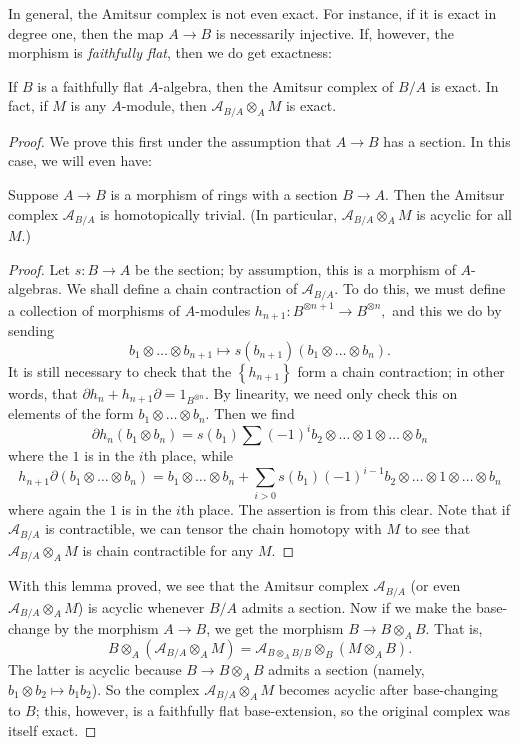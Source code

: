 In general, the Amitsur complex is not even exact. 
For instance, if it is exact in degree one, then the map $A \to B$ is necessarily injective.
If, however, the morphism is \emph{faithfully flat}, then we do get exactness:

\begin{theorem} 
If $B$ is a faithfully flat $A$-algebra, then the Amitsur complex of $B/A$ is
exact.  In fact, if $M$ is any $A$-module, then $\mathcal{A}_{B/A} \otimes_A
M$ is exact.
\end{theorem} 
\begin{proof} 
We prove this first under the assumption that $A \to B$ has a section. 
In this case, we will even have:

\begin{lemma} 
Suppose $A \to B$ is a morphism of rings with a section $B \to A$. Then the
Amitsur complex $\mathcal{A}_{B/A}$ is homotopically trivial. (In particular,
$\mathcal{A}_{B/A} \otimes_A M$ is acyclic for all $M$.)
\end{lemma} 
\begin{proof} 
Let $s: B \to A$ be the section; by assumption, this is a morphism of
$A$-algebras. We shall define a chain contraction of $\mathcal{A}_{B/A}$. 
To do this, we must define a collection of morphisms of $A$-modules
\( h_{n+1} : B^{\otimes n+1} \to B^{\otimes n},  \)
and this we do by sending 
\[ b_1 \otimes \dots \otimes b_{n+1} \mapsto s(b_{n+1}) \left( b_1 \otimes
\dots \otimes b_n \right).  \]
It is still necessary to check that the $\left\{h_{n+1}\right\}$ form a chain
contraction; in other words, that $\partial h_{n} + h_{n+1} \partial =
1_{B^{\otimes n}}$. 
By linearity, we need only check this on elements of the form $b_1 \otimes
\dots \otimes b_n$. Then we find
\[ \partial h_n (b_1 \otimes b_n) = s(b_1) \sum (-1)^i b_2 \otimes \dots \otimes 1
\otimes \dots \otimes b_n  \]
where the $1$ is in the $i$th place,
while
\[ h_{n+1} \partial ( b_1 \otimes \dots \otimes  b_n) = b_1 \otimes \dots \otimes b_n +
\sum_{i>0} s(b_1) (-1)^{i-1}b_2 \otimes \dots \otimes 1 \otimes \dots \otimes b_n  \]
where again the $1$ is in the $i$th place. The assertion is from this clear.
Note that if $\mathcal{A}_{B/A}$ is contractible, we can tensor the chain
homotopy with $M$ to see that $\mathcal{A}_{B/A} \otimes_A M$ is chain contractible
for any $M$.
\end{proof} 

With this lemma proved, we see that the Amitsur complex $\mathcal{A}_{B/A}$
(or even $\mathcal{A}_{B/A} \otimes_A M$) is acyclic whenever $B/A$ admits a
section. Now if we make the base-change by the morphism $A \to B$, we get the
morphism $B \to B \otimes_A B$. That is,
\[  B \otimes_A \left( \mathcal{A}_{B/A} \otimes_A M \right)= \mathcal{A}_{B
\otimes_A B/B} \otimes_B (M \otimes_A B). \]
The latter is acyclic because $B \to B \otimes_A B$ admits a section (namely,
$b_1 \otimes b_2 \mapsto b_1 b_2$). So the complex $\mathcal{A}_{B/A}
\otimes_A M$ becomes acyclic after base-changing to $B$; this, however, is a
faithfully flat base-extension, so the original complex was itself exact.
\end{proof} 

